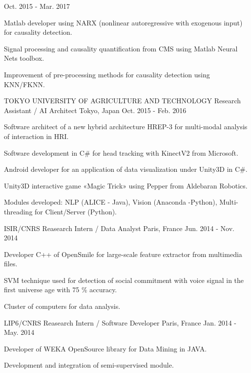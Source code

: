 \begin{cventries}
    {Oct. 2015 - Mar. 2017}
    {
      \begin{cvitems}
        \item {Matlab developer using NARX (nonlinear autoregressive with exogenous input) for  causality detection.}
        \item {Signal processing and causality quantification from CMS using Matlab Neural Nets toolbox.}
        \item {Improvement of pre-processing methods for causality detection using KNN/FKNN.}
      \end{cvitems}
    }
  \cventry
    {TOKYO UNIVERSITY OF AGRICULTURE AND TECHNOLOGY}
    {Research Assistant / AI Architect}
    {Tokyo, Japan}
    {Oct. 2015 - Feb. 2016}
    {
      \begin{cvitems}
        \item {Software architect of a new hybrid architecture HREP-3 for multi-modal analysis of interaction in HRI.}
        \item {Software development in C\# for head tracking with KinectV2 from Microsoft.}
        \item {Android developer for an application of data visualization under Unity3D in C\#.}
        \item {Unity3D interactive game «Magic Trick» using Pepper from Aldebaran Robotics.}
         \item{Modules developed: NLP (ALICE - Java), Vision (Anaconda -Python), Multi-threading for Client/Server (Python).}
        \end{cvitems}
    }
    \cventry
    {ISIR/CNRS}
    {Reasearch Intern / Data Analyst}
    {Paris, France}
    {Jun. 2014 - Nov. 2014}
    {
      \begin{cvitems}
       \item{Developer C++ of OpenSmile for large-scale feature extractor from multimedia files.}
       \item {SVM technique used for detection of social commitment with voice signal in the first universe age with 75 \% accuracy.}
       \item {Cluster of computers for data analysis.}
      \end{cvitems}
    }
    \cventry
    {LIP6/CNRS}
    {Reasearch Intern / Software Developer}
    {Paris, France}
    {Jan. 2014 - May. 2014}
    {
      \begin{cvitems}
       \item{Developer of WEKA OpenSource library for Data Mining in JAVA. }
       \item {Development and integration of semi-supervised module.}

\end{cvitems}}
\end{cventries}
